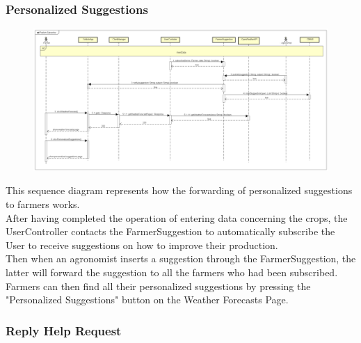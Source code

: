 \newpage
\subsubsection{Personalized Suggestions}

\begin{figure}[H]
    \begin{center}
        \includegraphics[width=\textwidth]{Images/SequenceDiagrams/Publish-SubscribeDD.png}
    \end{center}
\end{figure}

This sequence diagram represents how the forwarding of personalized suggestions to farmers works.\\
After having completed the operation of entering data concerning the crops, the UserController contacts 
the FarmerSuggestion to automatically subscribe the User to receive suggestions on how to improve their production.\\
Then when an agronomist inserts a suggestion through the FarmerSuggestion, the latter will 
forward the suggestion to all the farmers who had been subscribed.\\
Farmers can then find all their personalized suggestions by pressing the "Personalized Suggestions" button on the Weather Forecasts Page.


\newpage
\subsubsection{Reply Help Request}

